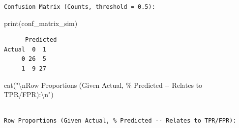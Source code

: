 \documentclass[
  letterpaper,
]{scrbook}
\newenvironment{Shaded}{\begin{snugshade}}{\end{snugshade}}
\newcommand{\AttributeTok}[1]{\textcolor[rgb]{0.40,0.45,0.13}{#1}}
\newcommand{\DecValTok}[1]{\textcolor[rgb]{0.68,0.00,0.00}{#1}}
\newcommand{\DocumentationTok}[1]{\textcolor[rgb]{0.37,0.37,0.37}{\textit{#1}}}
\newcommand{\FloatTok}[1]{\textcolor[rgb]{0.68,0.00,0.00}{#1}}
\newcommand{\FunctionTok}[1]{\textcolor[rgb]{0.28,0.35,0.67}{#1}}
\newcommand{\NormalTok}[1]{\textcolor[rgb]{0.00,0.23,0.31}{#1}}
\newcommand{\OtherTok}[1]{\textcolor[rgb]{0.00,0.23,0.31}{#1}}
\newcommand{\SpecialCharTok}[1]{\textcolor[rgb]{0.37,0.37,0.37}{#1}}
\newcommand{\StringTok}[1]{\textcolor[rgb]{0.13,0.47,0.30}{#1}}
\begin{document}
\begin{Shaded}
\end{Shaded}

\begin{verbatim}
Confusion Matrix (Counts, threshold = 0.5):
\end{verbatim}

\begin{Shaded}
\begin{Highlighting}[]
\FunctionTok{print}\NormalTok{(conf\_matrix\_sim)}
\end{Highlighting}
\end{Shaded}

\begin{verbatim}
      Predicted
Actual  0  1
     0 26  5
     1  9 27
\end{verbatim}

\begin{Shaded}
\begin{Highlighting}[]
\FunctionTok{cat}\NormalTok{(}\StringTok{"}\SpecialCharTok{\textbackslash{}n}\StringTok{Row Proportions (Given Actual, \% Predicted {-}{-} Relates to TPR/FPR):}\SpecialCharTok{\textbackslash{}n}\StringTok{"}\NormalTok{)}
\end{Highlighting}
\end{Shaded}

\begin{verbatim}

Row Proportions (Given Actual, % Predicted -- Relates to TPR/FPR):
\end{verbatim}
\end{document}
